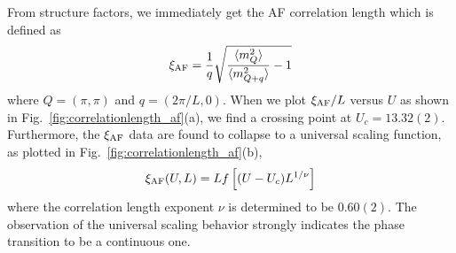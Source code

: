 \documentclass[twocolumn,superscriptaddress]{revtex4-1}
\begin{document}
From structure factors, we immediately get the AF correlation length which is defined as \cite{Sandvik2010a}
\begin{eqnarray}
  \xi_{\rm AF}=\frac{1}{q}\sqrt{\frac{\langle m_Q^2 \rangle}{\langle m_{Q+q}^2 \rangle}-1}
\end{eqnarray}
where $Q=(\pi,\pi)$ and $q=(2\pi/L,0)$. When we plot $\xi_{\rm AF}/L$ versus $U$ as shown in Fig.~\ref{fig:correlationlength_af}(a), we find a crossing point at $U_c=13.32(2)$. Furthermore, the $\xi_{\rm AF}$ data are found to collapse to a universal scaling function, as plotted in Fig.~\ref{fig:correlationlength_af}(b), 
\begin{eqnarray}\label{eq:scalinghypothesis}
  \xi_{\rm AF}(U,L)=L f\left[(U-U_c)L^{1/\nu}\right] 
\end{eqnarray}
where the correlation length exponent $\nu$ is determined to be $0.60(2)$. The observation of the universal scaling behavior strongly indicates the phase transition to be a continuous one. 


\end{document}
